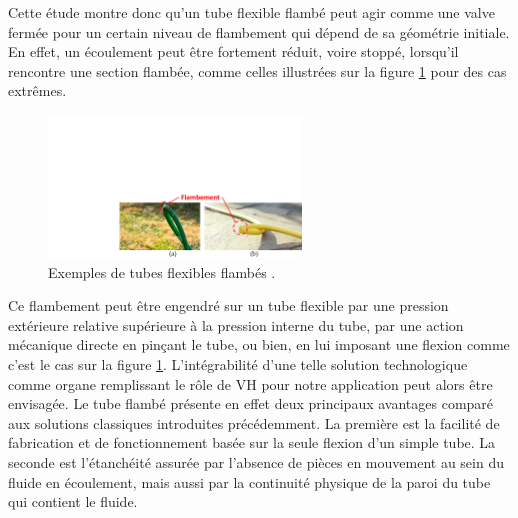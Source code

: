 Cette étude montre donc qu'un tube flexible flambé peut agir comme une valve fermée pour un certain niveau de flambement qui dépend de sa géométrie initiale. En effet, un écoulement peut être fortement réduit, voire stoppé, lorsqu'il rencontre une section flambée, comme celles illustrées sur la figure \ref{fig:tuyau_arrosage} pour des cas extrêmes.
\begin{figure}[!htbp]
\begin{center}
    \captionsetup{justification=centering}
	\includegraphics[trim={9cm 0cm 0cm 10cm},clip, 					                 width=0.6\textwidth]{../Chap2/Figure/tuyau_arrosage.pdf}
	\caption{Exemples de tubes flexibles flambés \cite{SMARTFLEXGarden2019,Blessingscaptured2022}.}
	\label{fig:tuyau_arrosage}
\end{center}	
\end{figure}
Ce flambement peut être engendré sur un tube flexible par une pression extérieure relative supérieure à la pression interne du tube, par une action mécanique directe en pinçant le tube, ou bien, en lui imposant une flexion comme c'est le cas sur la figure \ref{fig:tuyau_arrosage}. L'intégrabilité d'une telle solution technologique comme organe remplissant le rôle de VH pour notre application peut alors être envisagée. Le tube flambé présente en effet deux principaux avantages comparé aux solutions classiques introduites précédemment. La première est la facilité de fabrication et de fonctionnement basée sur la seule flexion d'un simple tube. La seconde est l'étanchéité assurée par l'absence de pièces en mouvement au sein du fluide en écoulement, mais aussi par la continuité physique de la paroi du tube qui contient le fluide.

